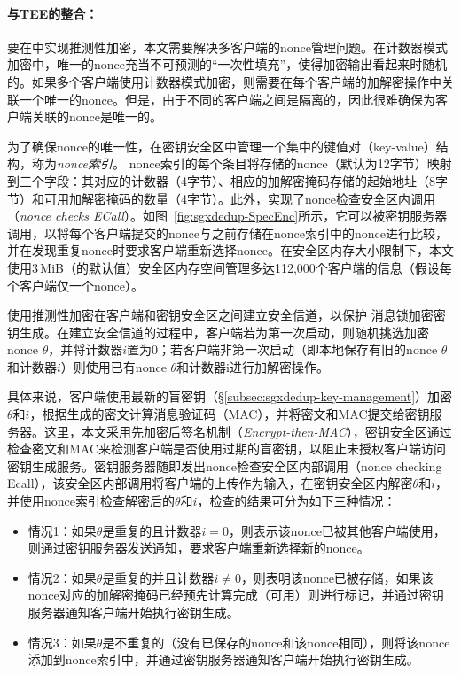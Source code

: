 \paragraph*{与TEE的整合：}要在\sysnameS 中实现推测性加密，本文需要解决多客户端的nonce管理问题。在计数器模式加密中，唯一的nonce充当不可预测的“一次性填充”，使得加密输出看起来时随机的\cite{counter}。如果多个客户端使用计数器模式加密，则需要在每个客户端的加解密操作中关联一个唯一的nonce。但是，由于不同的客户端之间是隔离的，因此很难确保为客户端关联的nonce是唯一的。

为了确保nonce的唯一性，\sysnameS 在密钥安全区中管理一个集中的键值对（key-value）结构，称为\textit{nonce索引}。 nonce索引的每个条目将存储的nonce（默认为12字节）映射到三个字段：其对应的计数器（4字节）、相应的加解密掩码存储的起始地址（8字节）和可用加解密掩码的数量（4字节）。此外，\sysnameS 实现了nonce检查安全区内调用（\textit{nonce checks ECall}）。如图~\ref{fig:sgxdedup-SpecEnc}所示，它可以被密钥服务器调用，以将每个客户端提交的nonce与之前存储在nonce索引中的nonce进行比较，并在发现重复nonce时要求客户端重新选择nonce。在安全区内存大小限制下，本文使用3\,MiB（\sysnameS 的默认值）安全区内存空间管理多达112,000个客户端的信息（假设每个客户端仅一个nonce）。

\sysnameS 使用推测性加密在客户端和密钥安全区之间建立安全信道，以保护 消息锁加密密钥生成。在建立安全信道的过程中，客户端若为第一次启动，则随机挑选加密nonce $\theta$，并将计数器$i$置为0；若客户端非第一次启动（即本地保存有旧的nonce $\theta$和计数器$i$）则使用已有nonce $\theta$和计数器i进行加解密操作。

具体来说，客户端使用最新的盲密钥（\S\ref{subsec:sgxdedup-key-management}）加密$\theta$和$i$，根据生成的密文计算消息验证码（MAC），并将密文和MAC提交给密钥服务器。这里，本文采用先加密后签名机制（\textit{Encrypt-then-MAC}）\cite{bellare2000Authenticated}，密钥安全区通过检查密文和MAC来检测客户端是否使用过期的盲密钥，以阻止未授权客户端访问密钥生成服务。密钥服务器随即发出nonce检查安全区内部调用（nonce checking Ecall），该安全区内部调用将客户端的上传作为输入，在密钥安全区内解密$\theta$和$i$，并使用nonce索引检查解密后的$\theta$和$i$，检查的结果可分为如下三种情况：

\begin{itemize}[leftmargin=*]
    \item 情况1：如果$\theta$是重复的且计数器$i = 0$，则表示该nonce已被其他客户端使用，则通过密钥服务器发送通知，要求客户端重新选择新的nonce。
    \item 情况2：如果$\theta$是重复的并且计数器$i \neq 0$，则表明该nonce已被存储，如果该nonce对应的加解密掩码已经预先计算完成（可用）则进行标记，并通过密钥服务器通知客户端开始执行密钥生成。
    \item 情况3：如果$\theta$是不重复的（没有已保存的nonce和该nonce相同），则将该nonce添加到nonce索引中，并通过密钥服务器通知客户端开始执行密钥生成。
\end{itemize}

